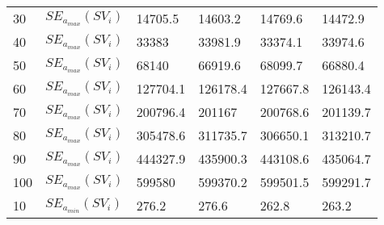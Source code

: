 \begin{table}[H]
\begin{tabular}{l l | l l | l l}
		30                                                          &  $SE_{a_{max}}(SV_i)$                                                        & 14705.5                   & 14603.2                   & 14769.6                 & 14472.9                 \\
		40                                                          &  $SE_{a_{max}}(SV_i)$                                                        & 33383                     & 33981.9                   & 33374.1                 & 33974.6                 \\
		50                                                          &  $SE_{a_{max}}(SV_i)$                                                        & 68140                     & 66919.6                   & 68099.7                 & 66880.4                 \\
		60                                                          &  $SE_{a_{max}}(SV_i)$                                                        & 127704.1                  & 126178.4                  & 127667.8                & 126143.4                \\
		70                                                          &  $SE_{a_{max}}(SV_i)$                                                        & 200796.4                  & 201167                    & 200768.6                & 201139.7                \\
		80                                                          &  $SE_{a_{max}}(SV_i)$                                                        & 305478.6                  & 311735.7                  & 306650.1                & 313210.7                \\
		90                                                          &  $SE_{a_{max}}(SV_i)$                                                        & 444327.9                  & 435900.3                  & 443108.6                & 435064.7                \\
		100                                                         &  $SE_{a_{max}}(SV_i)$                                                        & 599580                    & 599370.2                  & 599501.5                & 599291.7                \\
		10                                                          & $SE_{a_{min}}(SV_i)$                                                      & 276.2                     & 276.6                     & 262.8                   & 263.2                   \\

\end{tabular}
\end{table}
